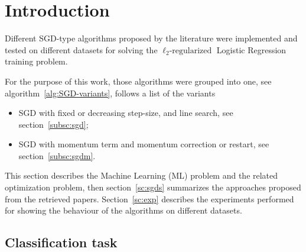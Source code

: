 \section{Introduction}\label{sc:intro}


Different SGD-type algorithms proposed by the literature were implemented and tested on different datasets for solving the $\ell_2\text{-regularized}$ Logistic Regression training problem.

For the purpose of this work, those algorithms were grouped into one, see algorithm~\vref{alg:SGD-variants}, follows a list of the variants
\begin{itemize}
\item SGD with fixed or decreasing step-size, and line search, see section~\vref{subsc:sgd};
\item SGD with momentum term and momentum correction or restart, see section~\vref{subsc:sgdm}.
\end{itemize}


This section describes the Machine Learning (ML) problem and the related optimization problem, then section~\vref{sc:sgds} summarizes the approaches proposed from the retrieved papers. Section~\vref{sc:exp} describes the experiments performed for showing the behaviour of the algorithms on different datasets.

\subsection{Classification task}


